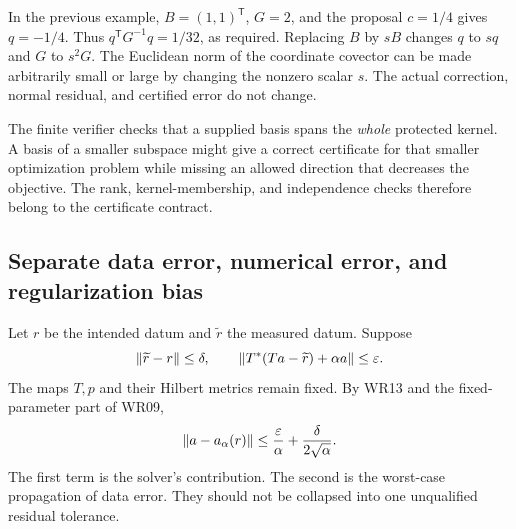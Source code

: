 In the previous example, $B=(1,1)^{\mathsf T}$, $G=2$, and the proposal $c=1/4$ gives $q=-1/4$. Thus $q^{\mathsf T}G^{-1}q=1/32$, as required. Replacing $B$ by $sB$ changes $q$ to $sq$ and $G$ to $s^2G$. The Euclidean norm of the coordinate covector can be made arbitrarily small or large by changing the nonzero scalar $s$. The actual correction, normal residual, and certified error do not change.


The finite verifier checks that a supplied basis spans the \emph{whole} protected kernel. A basis of a smaller subspace might give a correct certificate for that smaller optimization problem while missing an allowed direction that decreases the objective. The rank, kernel-membership, and independence checks therefore belong to the certificate contract.

\subsection{Separate data error, numerical error, and regularization bias}
Let $r$ be the intended datum and $\widetilde r$ the measured datum. Suppose
\[
 \left\lVert\widetilde r-r\right\rVert\le\delta,
 \qquad \left\lVert T^*(Ta-\widetilde r)+\alpha a\right\rVert\le\varepsilon.
\]
The maps $T,p$ and their Hilbert metrics remain fixed. By WR13 and the fixed-parameter part of WR09,
\begin{equation}\label{eq:combined-solver-data}
 \left\lVert a-a_\alpha(r)\right\rVert
 \le \frac{\varepsilon}{\alpha}+\frac{\delta}{2\sqrt\alpha}.
\end{equation}
The first term is the solver's contribution. The second is the worst-case propagation of data error. They should not be collapsed into one unqualified residual tolerance.

